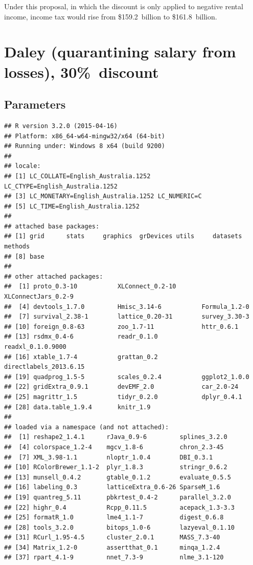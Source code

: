 \documentclass{grattan}\usepackage[]{graphicx}\usepackage[]{color}
\makeatletter
\newenvironment{kframe}{%
 \def\at@end@of@kframe{}%
 \ifinner\ifhmode%
  \def\at@end@of@kframe{\end{minipage}}%
  \begin{minipage}{\columnwidth}%
 \fi\fi%
 \def\FrameCommand##1{\hskip\@totalleftmargin \hskip-\fboxsep
 \colorbox{shadecolor}{##1}\hskip-\fboxsep
     \hskip-\linewidth \hskip-\@totalleftmargin \hskip\columnwidth}%
 \MakeFramed {\advance\hsize-\width
   \@totalleftmargin\z@ \linewidth\hsize
   \@setminipage}}%
 {\par\unskip\endMakeFramed%
 \at@end@of@kframe}
\newenvironment{knitrout}{}{} %
\makeatother
\begin{document}
Under this proposal, in which the discount is only applied to negative rental income, income tax would rise from \$159.2~billion to \$161.8~billion.

\section{Daley (quarantining salary from losses), 30\%\ discount}
\subsection{Parameters}

\begin{knitrout}
\color{fgcolor}\begin{kframe}
\begin{verbatim}
## R version 3.2.0 (2015-04-16)
## Platform: x86_64-w64-mingw32/x64 (64-bit)
## Running under: Windows 8 x64 (build 9200)
## 
## locale:
## [1] LC_COLLATE=English_Australia.1252  LC_CTYPE=English_Australia.1252   
## [3] LC_MONETARY=English_Australia.1252 LC_NUMERIC=C                      
## [5] LC_TIME=English_Australia.1252    
## 
## attached base packages:
## [1] grid      stats     graphics  grDevices utils     datasets  methods  
## [8] base     
## 
## other attached packages:
##  [1] proto_0.3-10           XLConnect_0.2-10       XLConnectJars_0.2-9   
##  [4] devtools_1.7.0         Hmisc_3.14-6           Formula_1.2-0         
##  [7] survival_2.38-1        lattice_0.20-31        survey_3.30-3         
## [10] foreign_0.8-63         zoo_1.7-11             httr_0.6.1            
## [13] rsdmx_0.4-6            readr_0.1.0            readxl_0.1.0.9000     
## [16] xtable_1.7-4           grattan_0.2            directlabels_2013.6.15
## [19] quadprog_1.5-5         scales_0.2.4           ggplot2_1.0.0         
## [22] gridExtra_0.9.1        devEMF_2.0             car_2.0-24            
## [25] magrittr_1.5           tidyr_0.2.0            dplyr_0.4.1           
## [28] data.table_1.9.4       knitr_1.9             
## 
## loaded via a namespace (and not attached):
##  [1] reshape2_1.4.1      rJava_0.9-6         splines_3.2.0      
##  [4] colorspace_1.2-4    mgcv_1.8-6          chron_2.3-45       
##  [7] XML_3.98-1.1        nloptr_1.0.4        DBI_0.3.1          
## [10] RColorBrewer_1.1-2  plyr_1.8.3          stringr_0.6.2      
## [13] munsell_0.4.2       gtable_0.1.2        evaluate_0.5.5     
## [16] labeling_0.3        latticeExtra_0.6-26 SparseM_1.6        
## [19] quantreg_5.11       pbkrtest_0.4-2      parallel_3.2.0     
## [22] highr_0.4           Rcpp_0.11.5         acepack_1.3-3.3    
## [25] formatR_1.0         lme4_1.1-7          digest_0.6.8       
## [28] tools_3.2.0         bitops_1.0-6        lazyeval_0.1.10    
## [31] RCurl_1.95-4.5      cluster_2.0.1       MASS_7.3-40        
## [34] Matrix_1.2-0        assertthat_0.1      minqa_1.2.4        
## [37] rpart_4.1-9         nnet_7.3-9          nlme_3.1-120
\end{verbatim}
\end{kframe}
\end{knitrout}
\twocolumn

\printbibliography
\end{document}
